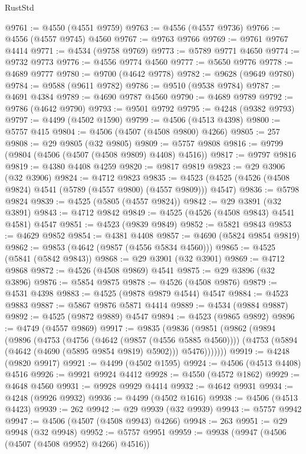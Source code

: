 \begin{lexlean}{RustStd}
\begin{coremodule}
{\begin{coremodule}
{{{{{{{{{{{{{{{{{{{{{{{{{{{{{{{{{{{{{{{{{{{{{{{{{{{{{{{@9761 := @4550 (@4551 @9759)
@9763 := @4556 (@4557 @9736)
@9766 := @4556 (@4557 @9745) @4560
@9767 := @9763 @9766
@9769 := @9761 @9767 @4414
@9771 := @4534 (@9758 @9769)
@9773 := @5789 @9771 @4650
@9774 := @9732 @9773
@9776 := @4556 @9774 @4560
@9777 := @5650 @9776
@9778 := @4689 @9777
@9780 := @9700 (@4642 @9778)
@9782 := @9628 (@9649 @9780)
@9784 := @9588 (@9611 @9782)
@9786 := @9510 (@9538 @9784)
@9787 := @4691 @4384
@9789 := @4690 @9787 @4560
@9790 := @4689 @9789
@9792 := @9786 (@4642 @9790)
@9793 := @9501 @9792
@9795 := @4248 (@9382 @9793)
@9797 := @4499 (@4502 @1590)
@9799 := @4506 (@4513 @4398)
@9800 := @5757 @415
@9804 := @4506 (@4507 (@4508 @9800) @4266)
@9805 := 257
@9808 := @29 @9805 (@32 @9805)
@9809 := @5757 @9808
@9816 := @9799 (@9804 (@4506 (@4507 (@4508 @9809) @4408) @4516))
@9817 := @9797 @9816
@9819 := @4380 @4408 @4259
@9820 := @9817 @9819
@9823 := @29 @3906 (@32 @3906)
@9824 := @4712 @9823
@9835 := @4523 (@4525 (@4526 (@4508 @9824) @4541 (@5789 (@4557 @9800) (@4557 @9809))) @4547)
@9836 := @5798 @9824
@9839 := @4525 (@5805 (@4557 @9824))
@9842 := @29 @3891 (@32 @3891)
@9843 := @4712 @9842
@9849 := @4525 (@4526 (@4508 @9843) @4541 @4581) @4547
@9851 := @4523 (@9839 @9849)
@9852 := @5821 @9843
@9853 := @4629 @9852
@9854 := @4381 @4408
@9857 := @4690 (@5824 @9854 @9819)
@9862 := @9853 (@4642 (@9857 (@4556 @5834 @4560)))
@9865 := @4525 (@5841 (@5842 @9843))
@9868 := @29 @3901 (@32 @3901)
@9869 := @4712 @9868
@9872 := @4526 (@4508 @9869) @4541
@9875 := @29 @3896 (@32 @3896)
@9876 := @5854 @9875
@9878 := @4526 (@4508 @9876)
@9879 := @4531 @4398
@9883 := @4525 (@9878 @9879 @4544) @4547
@9884 := @4523 @9883
@9887 := @5867 @9876 @5871 @4414
@9889 := @4534 (@9884 @9887)
@9892 := @4525 (@9872 @9889) @4547
@9894 := @4523 (@9865 @9892)
@9896 := @4749 (@4557 @9869)
@9917 := @9835
    (@9836
      (@9851
        (@9862
          (@9894
            (@9896
              (@4753
                (@4756 (@4642 (@9857 (@4556 @5885 @4560))))
                (@4753 (@5894 (@4642 (@4690 (@5895 @9854 @9819) @5902))) @5476)))))))
@9919 := @4248 (@9820 @9917)
@9921 := @4499 (@4502 @1595)
@9924 := @4506 (@4513 @4408) @4516
@9926 := @9921 @9924 @4412
@9928 := @4550 (@4572 @1862)
@9929 := @4648 @4560
@9931 := @9928 @9929 @4414
@9932 := @4642 @9931
@9934 := @4248 (@9926 @9932)
@9936 := @4499 (@4502 @1616)
@9938 := @4506 (@4513 @4423)
@9939 := 262
@9942 := @29 @9939 (@32 @9939)
@9943 := @5757 @9942
@9947 := @4506 (@4507 (@4508 @9943) @4266)
@9948 := 263
@9951 := @29 @9948 (@32 @9948)
@9952 := @5757 @9951
@9959 := @9938 (@9947 (@4506 (@4507 (@4508 @9952) @4266) @4516))
}}}}}}}}}}}}}}}}}}}}}}}}}}}}}}}}}}}}}}}}}}}}}}}}}}}}}}}
\end{coremodule}}
\end{coremodule}
\end{lexlean}

